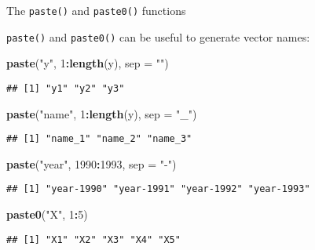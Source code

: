 \documentclass[ignorenonframetext,]{beamer}
\newenvironment{Shaded}{\begin{snugshade}}{\end{snugshade}}
\newcommand{\DataTypeTok}[1]{\textcolor[rgb]{0.13,0.29,0.53}{#1}}
\newcommand{\DecValTok}[1]{\textcolor[rgb]{0.00,0.00,0.81}{#1}}
\newcommand{\KeywordTok}[1]{\textcolor[rgb]{0.13,0.29,0.53}{\textbf{#1}}}
\newcommand{\NormalTok}[1]{#1}
\newcommand{\OperatorTok}[1]{\textcolor[rgb]{0.81,0.36,0.00}{\textbf{#1}}}
\newcommand{\StringTok}[1]{\textcolor[rgb]{0.31,0.60,0.02}{#1}}
\begin{document}
\begin{frame}[fragile]{The \texttt{paste()} and \texttt{paste0()}
functions}
\protect\hypertarget{the-paste-and-paste0-functions}{}

\texttt{paste()} and \texttt{paste0()} can be useful to generate vector
names:

\begin{Shaded}
\begin{Highlighting}[]
\KeywordTok{paste}\NormalTok{(}\StringTok{"y"}\NormalTok{, }\DecValTok{1}\OperatorTok{:}\KeywordTok{length}\NormalTok{(y), }\DataTypeTok{sep =} \StringTok{""}\NormalTok{)}
\end{Highlighting}
\end{Shaded}

\begin{verbatim}
## [1] "y1" "y2" "y3"
\end{verbatim}

\begin{Shaded}
\begin{Highlighting}[]
\KeywordTok{paste}\NormalTok{(}\StringTok{"name"}\NormalTok{, }\DecValTok{1}\OperatorTok{:}\KeywordTok{length}\NormalTok{(y), }\DataTypeTok{sep =} \StringTok{"_"}\NormalTok{)}
\end{Highlighting}
\end{Shaded}

\begin{verbatim}
## [1] "name_1" "name_2" "name_3"
\end{verbatim}

\begin{Shaded}
\begin{Highlighting}[]
\KeywordTok{paste}\NormalTok{(}\StringTok{"year"}\NormalTok{, }\DecValTok{1990}\OperatorTok{:}\DecValTok{1993}\NormalTok{, }\DataTypeTok{sep =} \StringTok{"-"}\NormalTok{)}
\end{Highlighting}
\end{Shaded}

\begin{verbatim}
## [1] "year-1990" "year-1991" "year-1992" "year-1993"
\end{verbatim}

\begin{Shaded}
\begin{Highlighting}[]
\KeywordTok{paste0}\NormalTok{(}\StringTok{"X"}\NormalTok{, }\DecValTok{1}\OperatorTok{:}\DecValTok{5}\NormalTok{)}
\end{Highlighting}
\end{Shaded}

\begin{verbatim}
## [1] "X1" "X2" "X3" "X4" "X5"
\end{verbatim}

\end{frame}
\end{document}

